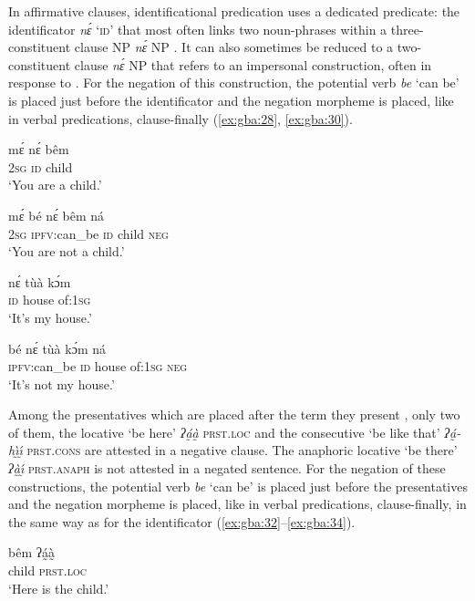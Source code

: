 \documentclass[output=paper,colorlinks=true, citecolor=brown]{langscibook}
\begin{document}
In affirmative clauses, identificational predication uses a dedicated predicate: the identificator \textit{nɛ́} ‘\textsc{id}’ that most often links two noun-phrases within a three-constituent clause NP \textit{nɛ́} NP . It can also sometimes be reduced to a two-constituent clause \textit{nɛ́} NP that refers to an impersonal construction, often in response to . For the negation of this construction, the potential verb \textit{be} ‘can be’ is placed just before the identificator and the negation morpheme is placed, like in verbal predications, clause-finally (\ref{ex:gba:28}, \ref{ex:gba:30}). 

\ea\label{ex:gba:27}
    \gll  mɛ́ nɛ́ bêm  \\ 
         2\textsc{sg} \textsc{id} child  \\ 
    \glt ‘You are a child.’
\z 

\ea\label{ex:gba:28}
    \gll mɛ́ bé nɛ́ bêm ná \\ 
         2\textsc{sg} \textsc{ipfv}:can\_be \textsc{id} child \textsc{neg} \\
    \glt ‘You are not a child.’
\z 

\ea\label{ex:gba:29}
    \gll nɛ́ tùà kɔ́m  \\ 
         \textsc{id} house of:1\textsc{sg}  \\
    \glt ‘It's my house.’
\z 

\ea\label{ex:gba:30}
    \gll bé nɛ́ tùà kɔ́m ná \\ 
         \textsc{ipfv}:can\_be \textsc{id} house of:1\textsc{sg} \textsc{neg} \\
    \glt ‘It's not my house.’
\z 

Among the presentatives which are placed after the term they present , only two of them, the locative ‘be here’ \textit{ʔá̰à̰ } \textsc{prst.loc} and the consecutive ‘be like that’ \textit{ʔá̰-h\`{ı̰}\'{ı̰} } \textsc{prst.cons} are attested in a negative clause. The anaphoric locative ‘be there’ \textit{ʔà̰\'{ı̰} } \textsc{prst.anaph} is not attested in a negated sentence. For the negation of these constructions, the potential verb \textit{be} ‘can be’ is placed just before the presentatives and the negation morpheme is placed, like in verbal predications, clause-finally, in the same way as for the identificator (\ref{ex:gba:32}--\ref{ex:gba:34}).

\ea\label{ex:gba:31}
    \gll bêm ʔá̰à̰  \\ 
         child \textsc{prst.loc}  \\
    \glt ‘Here is the child.’ 
\z 
 
\end{document}

